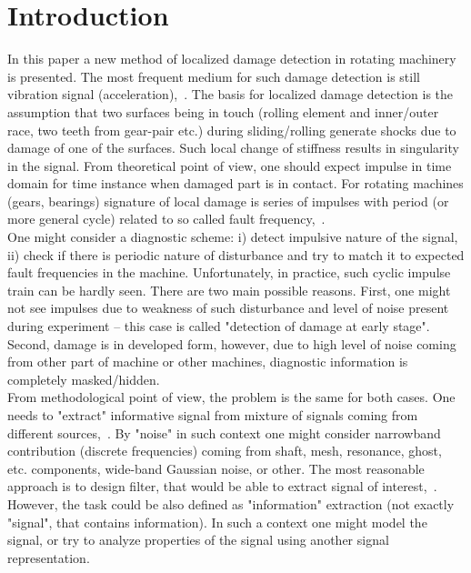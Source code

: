 \documentclass[3p,times]{elsarticle}
\begin{document}
\section{Introduction}
In this paper a new method of localized damage detection in rotating machinery is presented. The most frequent medium for such damage detection is still vibration signal (acceleration),~\cite{bib1,bib2}. The basis for localized damage detection is the assumption that two surfaces being in touch (rolling element and inner/outer race, two teeth from gear-pair etc.) during sliding/rolling generate shocks due to damage of one of the surfaces. Such local change of stiffness results in singularity in the signal. From theoretical point of view, one should expect impulse in time domain for time instance when damaged part is in contact. For rotating machines (gears, bearings) signature of local damage is series of impulses with period (or more general cycle) related to so called fault frequency,~\cite{bib28}.\\
One might consider a diagnostic scheme: i) detect impulsive nature of the signal, ii) check if there is periodic nature of disturbance and try to match it to expected fault frequencies in the machine. Unfortunately, in practice, such cyclic impulse train can be hardly seen. There are two main possible reasons. First, one might not see impulses due to weakness of such disturbance and level of noise present during experiment -- this case is called "detection of damage at early stage". Second, damage is in developed form, however, due to high level of noise coming from other part of machine or other machines, diagnostic information is completely masked/hidden.\\
From methodological point of view, the problem is the same for both cases. One needs to "extract" informative signal from mixture of signals coming from different sources,~\cite{bib2,bib3,bib4,bib5,bib6,bib7,bib14,bib15,bib16,bib19,bib20,bib21,bib22,bib23,bib26,bib27}. By "noise" in such context one might consider narrowband contribution (discrete frequencies) coming from shaft, mesh, resonance, ghost, etc. components, wide-band Gaussian noise, or other. The most reasonable approach is to design filter, that would be able to extract signal of interest,~\cite{bib19,bib20,bib21,bib22,bib23,bib17,bib18}. However, the task could be also defined as "information" extraction (not exactly "signal", that contains information). In such a context one might model the signal, or try to analyze properties of the signal using another signal representation.\\
\end{document}
